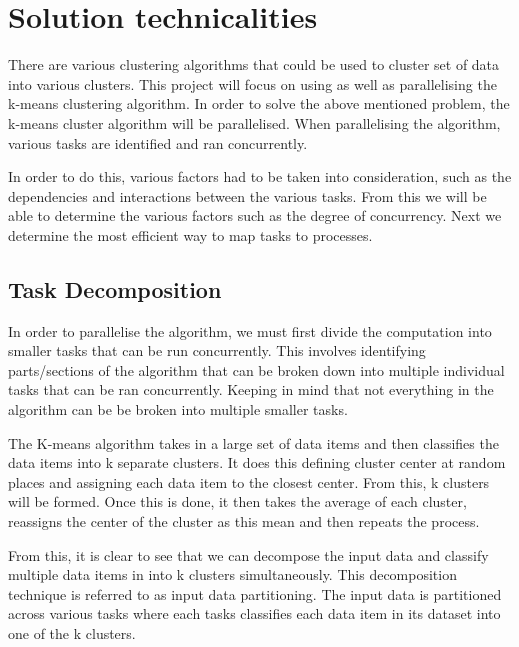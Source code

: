 \documentclass[12pt]{article}
\begin{document}
	\section{Solution technicalities}
  		\begin{flushleft}
  			There are various clustering algorithms that could be used to cluster set of data into various clusters. This project will focus on using as well as parallelising the k-means clustering algorithm. In order to solve the above mentioned problem, the k-means cluster algorithm will be parallelised. When parallelising the algorithm, various tasks are identified and ran concurrently.
    	\end{flushleft}
    	
    	\begin{flushleft}
    		In order to do this, various factors had to be taken into consideration, such as the dependencies and interactions between the various tasks. From this we will be able to determine the various factors such as the degree of concurrency. Next we determine the most efficient way to map tasks to processes. 
    	\end{flushleft}
    	
    	\subsection{Task Decomposition}
    		\begin{flushleft}
    			In order to parallelise the algorithm, we must first divide the computation into smaller tasks that can be run concurrently. This involves identifying parts/sections of the algorithm that can be broken down into multiple individual tasks that can be ran concurrently. Keeping in mind that not everything in the algorithm can be be broken into multiple smaller tasks.
    		\end{flushleft}
    	
    		\begin{flushleft}
    			The K-means algorithm takes in a large set of data items and then classifies the data items into k separate clusters. It does this defining cluster center at random places and assigning each data item to the closest center. From this, k clusters will be formed. Once this is done, it then takes the average of each cluster, reassigns the center of the cluster as this mean and then repeats the process.
    		\end{flushleft}
    	
    		\begin{flushleft}
    			From this, it is clear to see that we can decompose the input data and classify multiple data items in into k clusters simultaneously. This decomposition technique is referred to as input data partitioning. The input data is partitioned across various tasks where each tasks classifies each data item in its dataset into one of the k clusters.
    		\end{flushleft}
    	
\end{document}
